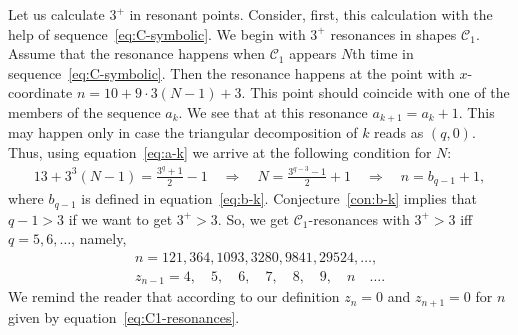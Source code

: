 \documentclass[pdftex]{sigma}
\numberwithin{equation}{section}
\begin{document}
Let us calculate $3^+$ in resonant points. Consider, first, this calculation with the help of sequence~\eqref{eq:C-symbolic}.
We begin with $3^+$ resonances in shapes $\mathcal{C}_1$. Assume that the resonance happens when $\mathcal{C}_1$ appears $N$th
time in sequence~\eqref{eq:C-symbolic}. Then the resonance happens at the point with $x$-coordinate $n=10+9\cdot3(N-1)+3$.
This point should coincide with one of the members of the sequence $a_k$. We see that at this resonance $a_{k+1}=a_{k}+1$.
This may happen only in case the triangular decomposition of $k$ reads as $(q,0)$. Thus, using equation~\eqref{eq:a-k} we arrive
at the following condition for $N$:
\begin{gather}\label{eq:C1-resonances}
13+3^3(N-1)=\frac{3^q+1}{2}-1 \quad \Longrightarrow \quad
N=\frac{3^{q-3}-1}{2}+1 \quad \Longrightarrow \quad
n=b_{q-1}+1,
\end{gather}
where $b_{q-1}$ is defined in equation~\eqref{eq:b-k}. Conjecture~\ref{con:b-k} implies that $q-1>3$ if we want to get $3^+>3$.
So, we get $\mathcal{C}_1$-resonances with $3^+>3$ iff $q=5,6,\ldots$, namely,
\begin{gather*}
n =121, 364, 1093, 3280, 9841, 29524,\ldots,\\ %
z_{n-1} = 4,\quad 5,\quad 6,\quad 7,\quad 8,\quad 9,\quad n \quad \ldots.\nonumber
\end{gather*}
We remind the reader that according to our definition $z_n=0$ and $z_{n+1}=0$ for $n$ given by equation~\eqref{eq:C1-resonances}.
\end{document}
